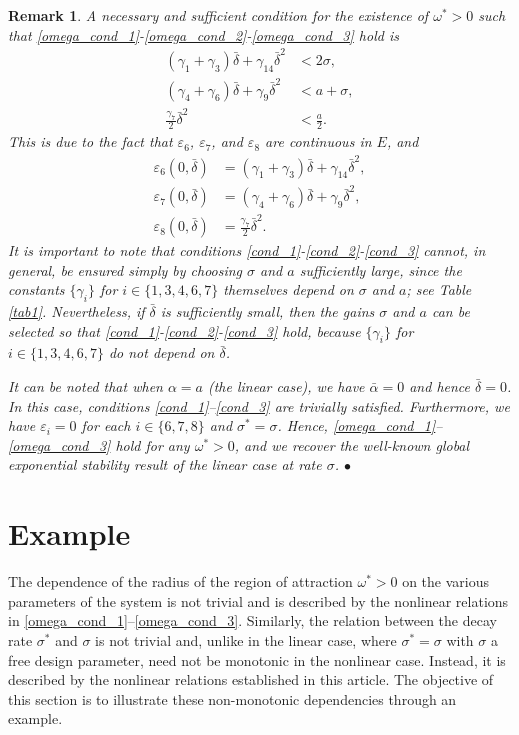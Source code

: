 \documentclass[twocolumn]{autart}
\newtheorem{remm}{Remark}
\newenvironment{remark}{\begin{remm} \rm}{\hfill \end{remm}}
\begin{document}
\begin{remark}
A necessary and sufficient condition for the existence of $\omega^*>0$ such that \eqref{omega_cond_1}-\eqref{omega_cond_2}-\eqref{omega_cond_3} hold is 
\begin{align}
(\gamma_1+\gamma_3)\bar{\delta}+\gamma_{14}\bar{\delta}^2 &< 2\sigma, \label{cond_1} \\
(\gamma_4+\gamma_6)\bar{\delta}+\gamma_9\bar{\delta}^2 &< a+\sigma, \label{cond_2}\\
\frac{\gamma_7}{2}\bar{\delta}^2 &< \frac{a}{2}. \label{cond_3}
\end{align}
This is due to the fact that $\varepsilon_6$, $\varepsilon_7$, and $\varepsilon_8$ are continuous in $E$, and 
\begin{align*}
\varepsilon_6(0,\bar{\delta}) &= (\gamma_1+\gamma_3)\bar{\delta}+\gamma_{14}\bar{\delta}^2, \\
\varepsilon_7(0,\bar{\delta}) &= (\gamma_4+\gamma_6)\bar{\delta}+\gamma_9\bar{\delta}^2, \\
\varepsilon_8(0,\bar{\delta}) &= \frac{\gamma_7}{2}\bar{\delta}^2. 
\end{align*}
It is important to note that conditions \eqref{cond_1}-\eqref{cond_2}-\eqref{cond_3} cannot, in general, be ensured simply by choosing $\sigma$ and $a$ sufficiently large, since the constants $\{\gamma_i\}$ for $i\in \{1,3,4,6,7\}$ themselves depend on $\sigma$ and $a$; see Table \ref{tab1}. Nevertheless, if $\bar{\delta}$ is sufficiently small, then the gains $\sigma$ and $a$ can be selected so that \eqref{cond_1}-\eqref{cond_2}-\eqref{cond_3} hold, because $\{\gamma_i\}$ for $i\in \{1,3,4,6,7\}$ do not depend on $\bar{\delta}$.  

It can be noted that when $\alpha = a$ (the linear case), we have $\bar{\alpha} = 0$ and hence $\bar{\delta}=0$. In this case, conditions \eqref{cond_1}--\eqref{cond_3} are trivially satisfied. Furthermore, we have $\varepsilon_i = 0$ for each $i\in \{6,7,8\}$ and $\sigma^*=\sigma$. Hence, \eqref{omega_cond_1}--\eqref{omega_cond_3} hold for any $\omega^*>0$, and we recover the well-known global exponential stability result of the linear case at rate $\sigma$.
\hfill $\bullet$
\end{remark}

\section{Example}\label{example}

The dependence of the radius of the region of attraction $\omega^*>0$ on the various parameters of the system is not trivial and is described by the nonlinear relations in \eqref{omega_cond_1}--\eqref{omega_cond_3}. Similarly, the relation between the decay rate $\sigma^*$ and $\sigma$ is not trivial and, unlike in the linear case, where $\sigma^*=\sigma$ with $\sigma$ a free design parameter, need not be monotonic in the nonlinear case. Instead, it is described by the nonlinear relations established in this article. The objective of this section is to illustrate these non-monotonic dependencies through an example.
\end{document}
